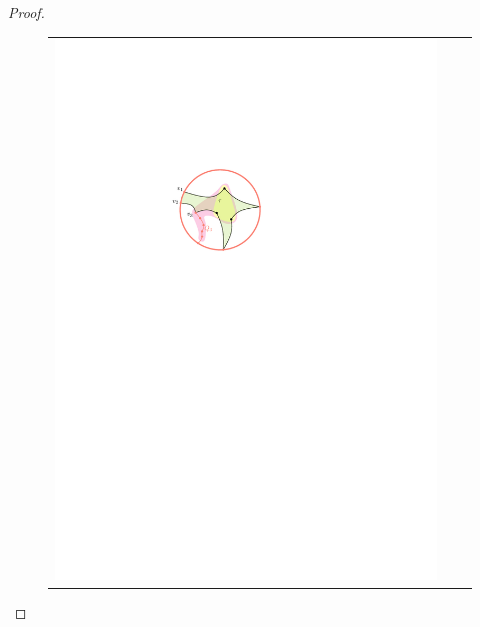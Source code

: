 \documentclass{patmorin}
\theoremstyle{plain}
\theoremstyle{definition}
\begin{document}
\begin{proof}
  \begin{figure}[!b]
    \begin{center}
      \begin{tabular}{c@{}c@{}c}
        \includegraphics{figs/zoomba-1} &

\end{tabular}
\end{center}
\end{figure}
\end{proof}
\end{document}
